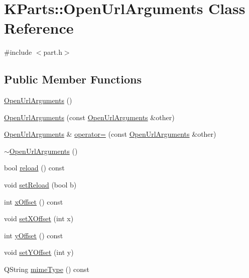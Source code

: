 \hypertarget{classKParts_1_1OpenUrlArguments}{\section{\-K\-Parts\-:\-:\-Open\-Url\-Arguments \-Class \-Reference}
\label{classKParts_1_1OpenUrlArguments}
}


{\ttfamily \#include $<$part.\-h$>$}

\subsection*{\-Public \-Member \-Functions}
\begin{DoxyCompactItemize}
\item 
\hyperlink{classKParts_1_1OpenUrlArguments_af4c1ee81217691a1dc9c7db9ba7d59f8}{\-Open\-Url\-Arguments} ()
\item 
\hyperlink{classKParts_1_1OpenUrlArguments_ac6d97bc2c3d8f926bd163b3a35bd5809}{\-Open\-Url\-Arguments} (const \hyperlink{classKParts_1_1OpenUrlArguments}{\-Open\-Url\-Arguments} \&other)
\item 
\hyperlink{classKParts_1_1OpenUrlArguments}{\-Open\-Url\-Arguments} \& \hyperlink{classKParts_1_1OpenUrlArguments_a17e55b23d031666e50cc96aae65233f3}{operator=} (const \hyperlink{classKParts_1_1OpenUrlArguments}{\-Open\-Url\-Arguments} \&other)
\item 
\hyperlink{classKParts_1_1OpenUrlArguments_a667623f26093523412bd9060b423971d}{$\sim$\-Open\-Url\-Arguments} ()
\item 
bool \hyperlink{classKParts_1_1OpenUrlArguments_a75c903644fed82bc1982cededcb1c05a}{reload} () const 
\item 
void \hyperlink{classKParts_1_1OpenUrlArguments_a2b9d7ac959db074ef06697de8f4e7a14}{set\-Reload} (bool b)
\item 
int \hyperlink{classKParts_1_1OpenUrlArguments_a3eb562ffb04cc93b0a5aa0e385058aa3}{x\-Offset} () const 
\item 
void \hyperlink{classKParts_1_1OpenUrlArguments_a2429db3ff60f2cca3aac4d3e9c7cde7b}{set\-X\-Offset} (int x)
\item 
int \hyperlink{classKParts_1_1OpenUrlArguments_a29dbdad63be6e6904d5fd2c9fd9cd38b}{y\-Offset} () const 
\item 
void \hyperlink{classKParts_1_1OpenUrlArguments_a19d0a9e25a2bbe4cd0d7c255bfa8441c}{set\-Y\-Offset} (int y)
\item 
\-Q\-String \hyperlink{classKParts_1_1OpenUrlArguments_aaddc679e216a0ce1a20983c0134675c5}{mime\-Type} () const 

\end{DoxyCompactItemize}
